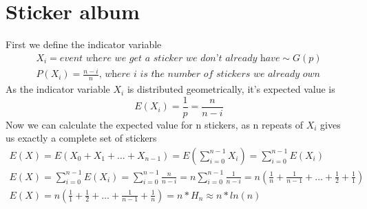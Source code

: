 \documentclass[12pt]{article}
\begin{document}
\section{Sticker album}
	First we define the indicator variable
	\begin{gather*}
	X_i = \textit{event where we get a sticker we don't already have} \sim G(p) \\
	P(X_i) = \frac{n-i}{n}\textit{, where i is the number of stickers we already own}
	\end{gather*}
	As the indicator variable $X_i$ is distributed geometrically, it's expected value is 
	\begin{equation*}
		E(X_i) = \frac{1}{p} = \frac{n}{n-i}
	\end{equation*}
	Now we can calculate the expected value for n stickers, as n repeats of $X_i$ gives us exactly a complete set of stickers
	\begin{gather*}
		E(X) = E(X_0 + X_1 + \dots + X_{n-1}) = E(\sum_{i=0}^{n-1}{X_i}) = \sum_{i=0}^{n-1}{E(X_i)}\\
		E(X) = \sum_{i=0}^{n-1}{E(X_i)} = \sum_{i=0}^{n-1}{\frac{n}{n-i}} = 
		n\sum_{i=0}^{n-1}{\frac{1}{n-i}} = n(\frac{1}{n} + \frac{1}{n-1} + \dots + \frac{1}{2} + \frac{1}{1})\\
		E(X) = n(\frac{1}{1} + \frac{1}{2} + \dots + \frac{1}{n-1} + \frac{1}{n}) = n * H_n \approx n * ln(n)
	\end{gather*}
\end{document}
